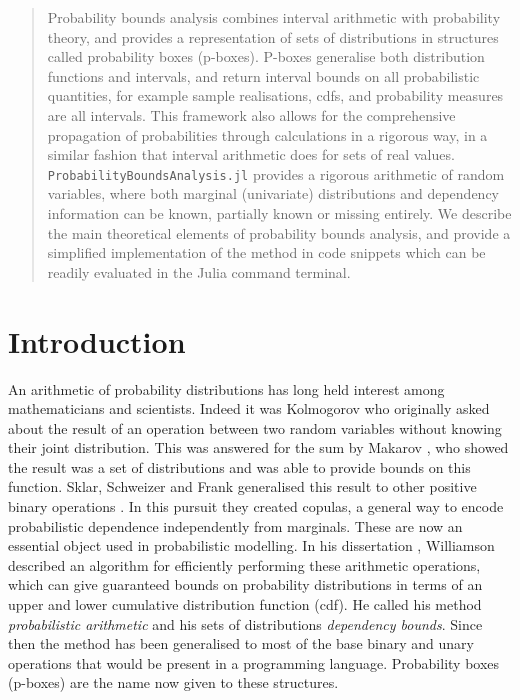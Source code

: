 \documentclass{juliacon}
\begin{document}

\maketitle
\begin{abstract}
Probability bounds analysis combines interval arithmetic with probability theory, and provides a representation of sets of distributions in structures called probability boxes (p-boxes). P-boxes generalise both distribution functions and intervals, and return interval bounds on all probabilistic quantities, for example sample realisations, cdfs, and probability measures are all intervals. This framework also allows for the comprehensive propagation of probabilities through calculations in a rigorous way, in a similar fashion that interval arithmetic does for sets of real values. \texttt{ProbabilityBoundsAnalysis.jl} provides a rigorous arithmetic of random variables, where both marginal (univariate) distributions and dependency information can be known, partially known or missing entirely. We describe the main theoretical elements of probability bounds analysis, and provide a simplified implementation of the method in code snippets which can be readily evaluated in the Julia command terminal.
\end{abstract}
\section{Introduction}
\label{sec:intro}
An arithmetic of probability distributions has long held interest among mathematicians and scientists. Indeed it was Kolmogorov who originally asked about the result of an operation between two random variables without knowing their joint distribution. This was answered for the sum by Makarov \cite{makarov1982estimates}, who showed the result was a set of distributions and was able to provide bounds on this function. Sklar, Schweizer and Frank generalised this result to other positive binary operations \cite{frank1987best,schweizer2011probabilistic}. In this pursuit they created copulas, a general way to encode probabilistic dependence independently from marginals. These are now an essential object used in probabilistic modelling. In his dissertation \cite{williamson1989probabilistic}, Williamson described an algorithm for efficiently performing these arithmetic operations, which can give guaranteed bounds on probability distributions in terms of an upper and lower cumulative distribution function (cdf). He called his method \textit{probabilistic arithmetic} and his sets of distributions \textit{dependency bounds}. Since then the method has been generalised \cite{ferson2015constructing,ferson1996whereof,ferson2004arithmetic} to most of the base binary and unary operations that would be present in a programming language. Probability boxes (p-boxes) are the name now given to these structures.
\end{document}
